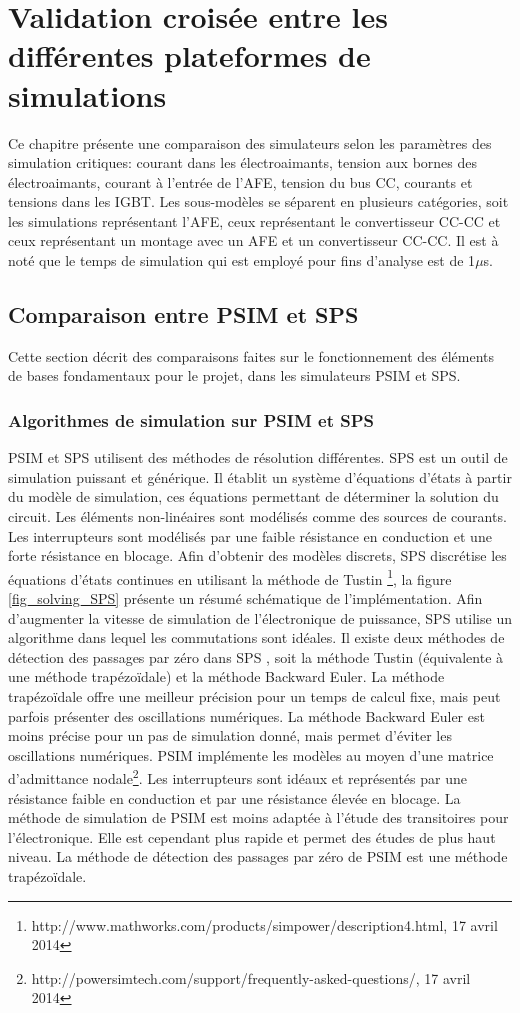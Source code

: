 \documentclass[11pt,letterpaper,final]{report}
\begin{document}
\chapter{Validation croisée entre les différentes plateformes de simulations}
Ce chapitre présente une comparaison des simulateurs selon les paramètres des simulation critiques: courant dans les électroaimants, tension aux bornes des électroaimants, courant à l'entrée de l'AFE, tension du bus CC, courants et tensions dans les IGBT. Les sous-modèles se séparent en plusieurs catégories, soit les simulations représentant l'AFE, ceux représentant le convertisseur CC-CC et ceux représentant un montage avec un AFE et un convertisseur CC-CC. Il est à noté que le temps de simulation qui est employé pour fins d'analyse est de 1$\mu$s. 

\section{Comparaison entre PSIM et SPS}
Cette section décrit des comparaisons faites sur le fonctionnement des éléments de bases fondamentaux pour le projet, dans les simulateurs PSIM et SPS.
\subsection{Algorithmes de simulation sur PSIM et SPS}
PSIM et SPS utilisent des méthodes de résolution différentes. SPS est un outil de simulation puissant et générique. Il établit un système d'équations d'états à partir du modèle de simulation, ces équations permettant de déterminer la solution du circuit. Les éléments non-linéaires sont modélisés comme des sources de courants. Les interrupteurs sont modélisés par une faible résistance en conduction et une forte résistance en blocage. Afin d'obtenir des modèles discrets, SPS discrétise les équations d'états continues en utilisant la méthode de Tustin  \footnote{http://www.mathworks.com/products/simpower/description4.html, 17 avril 2014}, la figure \ref{fig_solving_SPS} présente un résumé schématique de l'implémentation. Afin d'augmenter la vitesse de simulation de l'électronique de puissance, SPS utilise un algorithme dans lequel les commutations sont idéales. Il existe deux méthodes de détection des passages par zéro dans SPS , soit la méthode Tustin  (équivalente à une méthode trapézoïdale) et la méthode Backward Euler. La méthode trapézoïdale offre une meilleur précision pour un temps de calcul fixe, mais peut parfois présenter des oscillations numériques. La méthode Backward Euler est moins précise pour un pas de simulation donné, mais permet d'éviter les oscillations numériques. PSIM implémente les modèles au moyen d'une matrice d'admittance nodale\footnote{http://powersimtech.com/support/frequently-asked-questions/, 17 avril 2014}. Les interrupteurs sont idéaux et représentés par une résistance faible en conduction et par une résistance élevée en blocage. La méthode de simulation de PSIM est moins adaptée à l'étude des transitoires pour l'électronique. Elle est cependant plus rapide et permet des études de plus haut niveau. La méthode de détection des passages par zéro de PSIM est une méthode trapézoïdale. 
\end{document}

